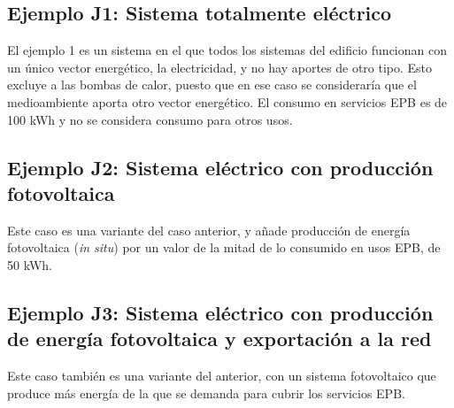 \documentclass[10pt,notitlepage,oneside,a4paper]{article}
\begin{document}
\subsection{Ejemplo J1: Sistema totalmente eléctrico}
El ejemplo 1 es un sistema en el que todos los sistemas del edificio funcionan con un único vector energético, la electricidad, y no hay aportes de otro tipo. Esto excluye a las bombas de calor, puesto que en ese caso se consideraría que el medioambiente aporta otro vector energético. El consumo en servicios EPB es de 100 kWh y no se considera consumo para otros usos.






\subsection{Ejemplo J2: Sistema eléctrico con producción fotovoltaica}

Este caso es una variante del caso anterior, y añade producción de energía fotovoltaica (\textit{in situ}) por un valor de la mitad de lo consumido en usos EPB, de 50 kWh.





\subsection{Ejemplo J3: Sistema eléctrico con producción de energía fotovoltaica y exportación a la red}

Este caso también es una variante del anterior, con un sistema fotovoltaico que produce más energía de la que se demanda para cubrir los servicios EPB.




\end{document}
